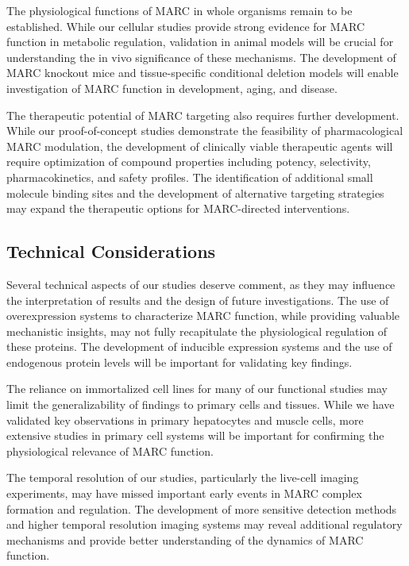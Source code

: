 \documentclass[11pt,a4paper]{article}
\begin{document}
The physiological functions of MARC in whole organisms remain to be established. While our cellular studies provide strong evidence for MARC function in metabolic regulation, validation in animal models will be crucial for understanding the in vivo significance of these mechanisms. The development of MARC knockout mice and tissue-specific conditional deletion models will enable investigation of MARC function in development, aging, and disease.

The therapeutic potential of MARC targeting also requires further development. While our proof-of-concept studies demonstrate the feasibility of pharmacological MARC modulation, the development of clinically viable therapeutic agents will require optimization of compound properties including potency, selectivity, pharmacokinetics, and safety profiles. The identification of additional small molecule binding sites and the development of alternative targeting strategies may expand the therapeutic options for MARC-directed interventions.

\subsection{Technical Considerations}

Several technical aspects of our studies deserve comment, as they may influence the interpretation of results and the design of future investigations. The use of overexpression systems to characterize MARC function, while providing valuable mechanistic insights, may not fully recapitulate the physiological regulation of these proteins. The development of inducible expression systems and the use of endogenous protein levels will be important for validating key findings.

The reliance on immortalized cell lines for many of our functional studies may limit the generalizability of findings to primary cells and tissues. While we have validated key observations in primary hepatocytes and muscle cells, more extensive studies in primary cell systems will be important for confirming the physiological relevance of MARC function.

The temporal resolution of our studies, particularly the live-cell imaging experiments, may have missed important early events in MARC complex formation and regulation. The development of more sensitive detection methods and higher temporal resolution imaging systems may reveal additional regulatory mechanisms and provide better understanding of the dynamics of MARC function.
\end{document}
